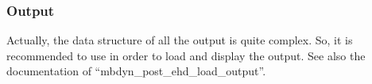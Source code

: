 \subsubsection{Output}
Actually, the data structure of all the output is quite complex. So, it is recommended to use  in order to load and display the output. See also the documentation of ``mbdyn\_post\_ehd\_load\_output''.
